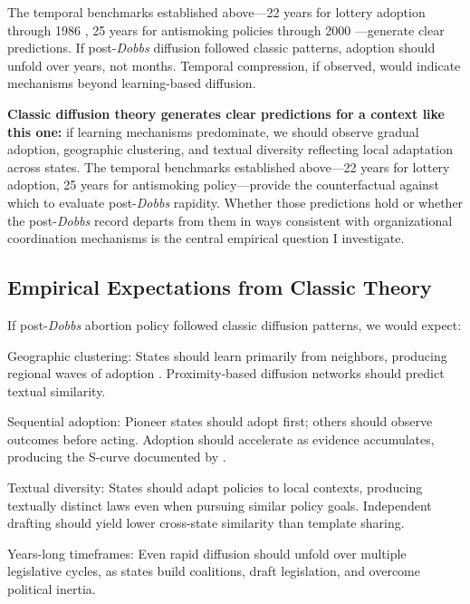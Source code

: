 The temporal benchmarks established above---22 years for lottery adoption through 1986 \parencite{berryStateLotteryAdoptions1990}, 25 years for antismoking policies through 2000 \parencite{shipanMechanismsPolicyDiffusion2008a}---generate clear predictions. If post-\emph{Dobbs} diffusion followed classic patterns, adoption should unfold over years, not months. Temporal compression, if observed, would indicate mechanisms beyond learning-based diffusion.

\textbf{Classic diffusion theory generates clear predictions for a context like this one:} if learning mechanisms predominate, we should observe gradual adoption, geographic clustering, and textual diversity reflecting local adaptation across states. The temporal benchmarks established above---22 years for lottery adoption, 25 years for antismoking policy---provide the counterfactual against which to evaluate post-\emph{Dobbs} rapidity. Whether those predictions hold or whether the post-\emph{Dobbs} record departs from them in ways consistent with organizational coordination mechanisms is the central empirical question I investigate.

\subsection{Empirical Expectations from Classic Theory}

If post-\emph{Dobbs} abortion policy followed classic diffusion patterns, we would expect:

Geographic clustering: States should learn primarily from neighbors, producing regional waves of adoption \parencite{walkerDiffusionInnovationsAmerican1969, grayInnovationStatesDiffusion1973}. Proximity-based diffusion networks should predict textual similarity.

Sequential adoption: Pioneer states should adopt first; others should observe outcomes before acting. Adoption should accelerate as evidence accumulates, producing the S-curve documented by \textcite{shipanMechanismsPolicyDiffusion2008a}.

Textual diversity: States should adapt policies to local contexts, producing textually distinct laws even when pursuing similar policy goals. Independent drafting should yield lower cross-state similarity than template sharing.

Years-long timeframes: Even rapid diffusion should unfold over multiple legislative cycles, as states build coalitions, draft legislation, and overcome political inertia.

